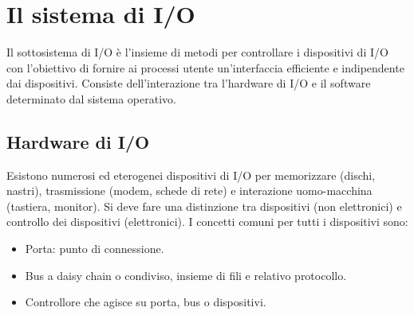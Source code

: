 \chapter{Il sistema di I/O}
Il sottosistema di I/O \`e l'insieme di metodi per controllare i dispositivi di I/O con l'obiettivo di fornire ai processi utente un'interfaccia efficiente e indipendente dai 
dispositivi. Consiste dell'interazione tra l'hardware di I/O e il software determinato dal sistema operativo. 
\section{Hardware di I/O}
Esistono numerosi ed eterogenei dispositivi di I/O per memorizzare (dischi, nastri), trasmissione (modem, schede di rete) e interazione uomo-macchina (tastiera, monitor). Si deve fare
una distinzione tra dispositivi (non elettronici) e controllo dei dispositivi (elettronici). I concetti comuni per tutti i dispositivi sono:
\begin{itemize}
	\item Porta: punto di connessione.
	\item Bus a daisy chain o condiviso, insieme di fili e relativo protocollo.
	\item Controllore che agisce su porta, bus o dispositivi. 
\end{itemize}
